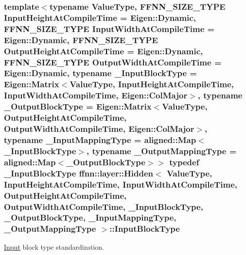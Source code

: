 \hypertarget{classffnn_1_1layer_1_1_hidden_a01b9cc4df01a7b26423dcd3a0af17b1c}{
\subsubsection[{Input\-Block\-Type}]{\setlength{\rightskip}{0pt plus 5cm}template$<$typename Value\-Type, F\-F\-N\-N\-\_\-\-S\-I\-Z\-E\-\_\-\-T\-Y\-P\-E Input\-Height\-At\-Compile\-Time = Eigen\-::\-Dynamic, F\-F\-N\-N\-\_\-\-S\-I\-Z\-E\-\_\-\-T\-Y\-P\-E Input\-Width\-At\-Compile\-Time = Eigen\-::\-Dynamic, F\-F\-N\-N\-\_\-\-S\-I\-Z\-E\-\_\-\-T\-Y\-P\-E Output\-Height\-At\-Compile\-Time = Eigen\-::\-Dynamic, F\-F\-N\-N\-\_\-\-S\-I\-Z\-E\-\_\-\-T\-Y\-P\-E Output\-Width\-At\-Compile\-Time = Eigen\-::\-Dynamic, typename \-\_\-\-Input\-Block\-Type = Eigen\-::\-Matrix$<$\-Value\-Type, Input\-Height\-At\-Compile\-Time, Input\-Width\-At\-Compile\-Time, Eigen\-::\-Col\-Major$>$, typename \-\_\-\-Output\-Block\-Type = Eigen\-::\-Matrix$<$\-Value\-Type, Output\-Height\-At\-Compile\-Time, Output\-Width\-At\-Compile\-Time, Eigen\-::\-Col\-Major$>$, typename \-\_\-\-Input\-Mapping\-Type = aligned\-::\-Map$<$\-\_\-\-Input\-Block\-Type$>$, typename \-\_\-\-Output\-Mapping\-Type = aligned\-::\-Map$<$\-\_\-\-Output\-Block\-Type$>$$>$ typedef \-\_\-\-Input\-Block\-Type {\bf ffnn\-::layer\-::\-Hidden}$<$ Value\-Type, Input\-Height\-At\-Compile\-Time, Input\-Width\-At\-Compile\-Time, Output\-Height\-At\-Compile\-Time, Output\-Width\-At\-Compile\-Time, \-\_\-\-Input\-Block\-Type, \-\_\-\-Output\-Block\-Type, \-\_\-\-Input\-Mapping\-Type, \-\_\-\-Output\-Mapping\-Type $>$\-::{\bf Input\-Block\-Type}}}\label{classffnn_1_1layer_1_1_hidden_a01b9cc4df01a7b26423dcd3a0af17b1c}


\hyperlink{classffnn_1_1layer_1_1_input}{Input} block type standardization. 

